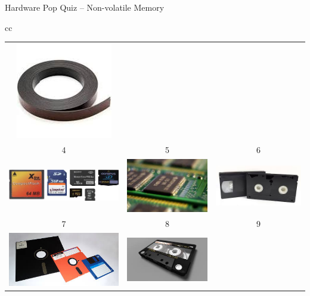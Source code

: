 \documentclass[compress,11pt,xcolor=svgnames,aspectratio=169]{beamer}
\begin{document}
\begin{frame}[fragile] {Hardware Pop Quiz -- Non-volatile Memory}
\begin{center}
\begin{tabular}{cc}
\begin{tabular}{ccc}
\includegraphics[scale=0.15]{fig/tape} \\
4 & 5 & 6 \\
\includegraphics[scale=0.15]{fig/card} &
\includegraphics[scale=0.15]{fig/rom} &
\includegraphics[scale=0.15]{fig/vhs} \\
7 & 8 & 9 \\
\includegraphics[scale=0.15]{fig/floppy} &
\includegraphics[scale=0.15]{fig/k7} &

\end{tabular}
\end{tabular}
\end{center}
\end{frame}
\end{document}
